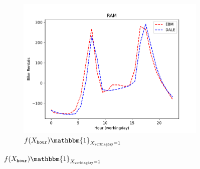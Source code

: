 \documentclass{beamer}
\newcommand{\when}[1]{\mathbbm{1}_{#1}}
\begin{document}
\begin{frame}
\begin{figure}[htbp]
\begin{subfigure}{0.32\textwidth}
        \label{subfig:bike_rentals_regional_gam_1}
    \end{subfigure}
    \begin{subfigure}{0.32\textwidth}
        \centering
        \includegraphics[width=\textwidth]{figures/bike_rentals_ram_2}
        \caption{\(f(X_{\mathtt{hour}}) \when{X_{\mathtt{workingday}} = 1}\)}
        \label{subfig:bike_rentals_regional_gam_2}
    \end{subfigure}
    \label{fig:bike_sharing}
\end{figure}

\end{frame}
\end{document}
